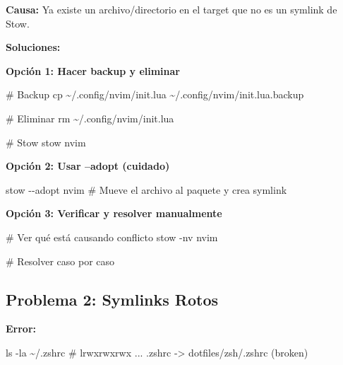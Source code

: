\documentclass[
  doc,
  floatsintext,
  longtable,
  a4paper,
  nolmodern,
  notxfonts,
  notimes,
  12pt,
  colorlinks=true,linkcolor=blue,citecolor=blue,urlcolor=blue]{apa7}
\newenvironment{Shaded}{\begin{snugshade}}{\end{snugshade}}
\newcommand{\AttributeTok}[1]{\textcolor[rgb]{0.40,0.45,0.13}{#1}}
\newcommand{\CommentTok}[1]{\textcolor[rgb]{0.37,0.37,0.37}{#1}}
\newcommand{\ExtensionTok}[1]{\textcolor[rgb]{0.00,0.23,0.31}{#1}}
\newcommand{\FunctionTok}[1]{\textcolor[rgb]{0.28,0.35,0.67}{#1}}
\newcommand{\NormalTok}[1]{\textcolor[rgb]{0.00,0.23,0.31}{#1}}
\begin{document}
\textbf{Causa:} Ya existe un archivo/directorio en el target que no es
un symlink de Stow.

\textbf{Soluciones:}

\textbf{Opción 1: Hacer backup y eliminar}

\begin{Shaded}
\begin{Highlighting}[]
\CommentTok{\# Backup}
\FunctionTok{cp}\NormalTok{ \textasciitilde{}/.config/nvim/init.lua \textasciitilde{}/.config/nvim/init.lua.backup}

\CommentTok{\# Eliminar}
\FunctionTok{rm}\NormalTok{ \textasciitilde{}/.config/nvim/init.lua}

\CommentTok{\# Stow}
\ExtensionTok{stow}\NormalTok{ nvim}
\end{Highlighting}
\end{Shaded}

\textbf{Opción 2: Usar --adopt (cuidado)}

\begin{Shaded}
\begin{Highlighting}[]
\ExtensionTok{stow} \AttributeTok{{-}{-}adopt}\NormalTok{ nvim}
\CommentTok{\# Mueve el archivo al paquete y crea symlink}
\end{Highlighting}
\end{Shaded}

\textbf{Opción 3: Verificar y resolver manualmente}

\begin{Shaded}
\begin{Highlighting}[]
\CommentTok{\# Ver qué está causando conflicto}
\ExtensionTok{stow} \AttributeTok{{-}nv}\NormalTok{ nvim}

\CommentTok{\# Resolver caso por caso}
\end{Highlighting}
\end{Shaded}

\subsection{Problema 2: Symlinks Rotos}\label{problema-2-symlinks-rotos}

\textbf{Error:}

\begin{Shaded}
\begin{Highlighting}[]
\FunctionTok{ls} \AttributeTok{{-}la}\NormalTok{ \textasciitilde{}/.zshrc}
\CommentTok{\# lrwxrwxrwx ... .zshrc {-}\textgreater{} dotfiles/zsh/.zshrc (broken)}
\end{Highlighting}
\end{Shaded}
\end{document}
